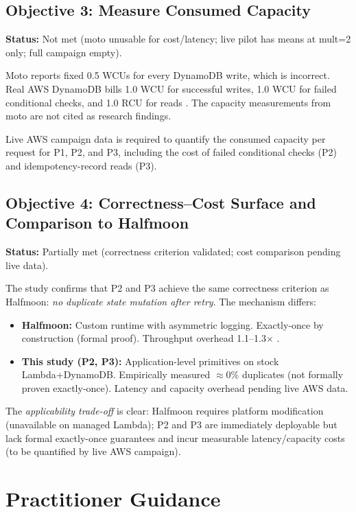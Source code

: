 \subsection{Objective 3: Measure Consumed Capacity}

\textbf{Status:} Not met (moto unusable for cost/latency; live pilot has means at mult=2 only; full campaign empty).

Moto reports fixed 0.5 WCUs for every DynamoDB write, which is incorrect. Real AWS DynamoDB bills 1.0 WCU for successful writes, 1.0 WCU for failed conditional checks, and 1.0 RCU for reads \citep{AWSDynamoDBDocs, Elhemali2022DynamoDB}. The capacity measurements from moto are not cited as research findings.

Live AWS campaign data is required to quantify the consumed capacity per request for P1, P2, and P3, including the cost of failed conditional checks (P2) and idempotency-record reads (P3).

\subsection{Objective 4: Correctness--Cost Surface and Comparison to Halfmoon}

\textbf{Status:} Partially met (correctness criterion validated; cost comparison pending live data).

The study confirms that P2 and P3 achieve the same correctness criterion as Halfmoon: \textit{no duplicate state mutation after retry}. The mechanism differs:

\begin{itemize}
    \item \textbf{Halfmoon:} Custom runtime with asymmetric logging. Exactly-once by construction (formal proof). Throughput overhead 1.1--1.3$\times$ \citep{Qi2025Halfmoon}.
    \item \textbf{This study (P2, P3):} Application-level primitives on stock Lambda+DynamoDB. Empirically measured $\approx 0\%$ duplicates (not formally proven exactly-once). Latency and capacity overhead pending live AWS data.
\end{itemize}

The \textit{applicability trade-off} is clear: Halfmoon requires platform modification (unavailable on managed Lambda); P2 and P3 are immediately deployable but lack formal exactly-once guarantees and incur measurable latency/capacity costs (to be quantified by live AWS campaign).

\section{Practitioner Guidance}

